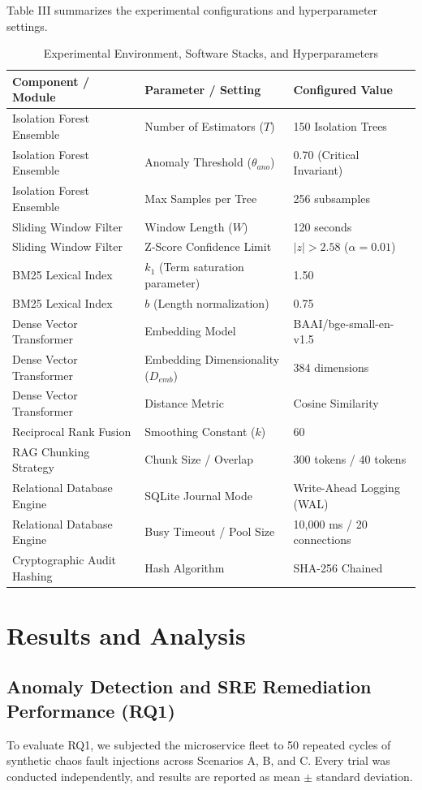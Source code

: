 \documentclass[12pt,onecolumn,draftclsnofoot]{IEEEtran}
\begin{document}
Table III summarizes the experimental configurations and hyperparameter settings.

\begin{table}[ht]
\caption{Experimental Environment, Software Stacks, and Hyperparameters}
\centering
\small
\begin{tabular}{lll}
\toprule
\textbf{Component / Module} & \textbf{Parameter / Setting} & \textbf{Configured Value} \\
\midrule
Isolation Forest Ensemble & Number of Estimators ($T$) & 150 Isolation Trees \\
Isolation Forest Ensemble & Anomaly Threshold ($\theta_{ano}$) & 0.70 (Critical Invariant) \\
Isolation Forest Ensemble & Max Samples per Tree & 256 subsamples \\
Sliding Window Filter & Window Length ($W$) & 120 seconds \\
Sliding Window Filter & Z-Score Confidence Limit & $|z| > 2.58$ ($\alpha = 0.01$) \\
BM25 Lexical Index & $k_1$ (Term saturation parameter) & 1.50 \\
BM25 Lexical Index & $b$ (Length normalization) & 0.75 \\
Dense Vector Transformer & Embedding Model & BAAI/bge-small-en-v1.5 \\
Dense Vector Transformer & Embedding Dimensionality ($D_{emb}$) & 384 dimensions \\
Dense Vector Transformer & Distance Metric & Cosine Similarity \\
Reciprocal Rank Fusion & Smoothing Constant ($k$) & 60 \\
RAG Chunking Strategy & Chunk Size / Overlap & 300 tokens / 40 tokens \\
Relational Database Engine & SQLite Journal Mode & Write-Ahead Logging (WAL) \\
Relational Database Engine & Busy Timeout / Pool Size & 10,000 ms / 20 connections \\
Cryptographic Audit Hashing & Hash Algorithm & SHA-256 Chained \\
\bottomrule
\end{tabular}
\end{table}

\section{Results and Analysis}

\subsection{Anomaly Detection and SRE Remediation Performance (RQ1)}
To evaluate RQ1, we subjected the microservice fleet to 50 repeated cycles of synthetic chaos fault injections across Scenarios A, B, and C. Every trial was conducted independently, and results are reported as mean $\pm$ standard deviation.
\end{document}

